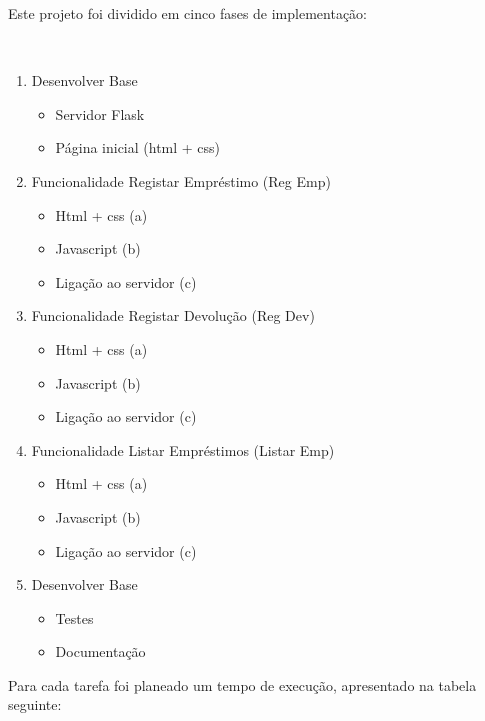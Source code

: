 \documentclass[12pt, a4paper, twoside]{article}
\begin{document}
Este projeto foi dividido em cinco fases de implementação:

\\
\begin{enumerate}
	\item Desenvolver Base
  	\begin{itemize}
		\item Servidor Flask
  		\item Página inicial (html + css)
  	\end{itemize}
  	\item Funcionalidade Registar Empréstimo (Reg Emp)
  	\begin{itemize}
  		\item Html + css (a)
  		\item Javascript (b)
  		\item Ligação ao servidor (c)
	\end{itemize}
	\item Funcionalidade Registar Devolução (Reg Dev)
  	\begin{itemize}
  		\item Html + css (a)
  		\item Javascript (b)
  		\item Ligação ao servidor (c)
	\end{itemize}
	\item Funcionalidade Listar Empréstimos (Listar Emp)
  	\begin{itemize}
  		\item Html + css (a)
  		\item Javascript (b)
  		\item Ligação ao servidor (c)
	\end{itemize}
	\item Desenvolver Base
  	\begin{itemize}
  		\item Testes
  		\item Documentação
	\end{itemize}
\end{enumerate}

\newpage
Para cada tarefa foi planeado um tempo de execução, apresentado na tabela seguinte:
\end{document}
